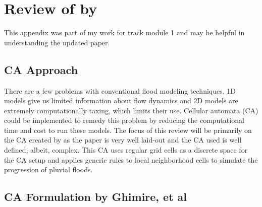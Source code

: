 

\chapter{Review of  by \citeauthor{Ghimire}} %
\label{AppendixA} %


This appendix was part of my work for track module 1 and may be helpful in understanding the updated paper.
\section*{CA Approach}
There are a few problems with conventional flood modeling techniques. 1D models give us limited information about flow dynamics and 2D models are extremely computationally taxing, which limits their use. Cellular automata (CA) could be implemented to remedy this problem by reducing the computational time and cost to run these models. The focus of this review will be primarily on the CA created by \cite{Ghimire} as the paper is very well laid-out and the CA used is well defined, albeit, complex. This CA uses regular grid cells as a discrete space for the CA setup and applies generic rules to local neighborhood cells to simulate the progression of pluvial floods.

\section*{CA Formulation by Ghimire, et al}


